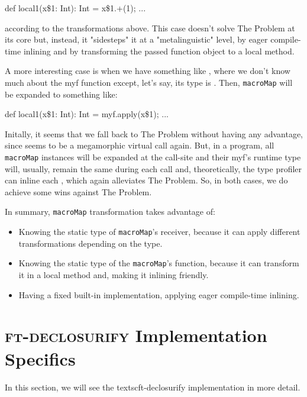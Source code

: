 \begin{scalaCode}
{
  def local1(x\$1: Int): Int = x\$1.+(1);
  ...
}
\end{scalaCode}

according to the transformations above. This case doesn't solve The Problem
at its core but, instead, it "sidesteps" it at a "metalinguistic" level, by
eager compile-time inlining and by transforming the passed function
object to a local method.

A more interesting case is when we have something like , where we don't know much about the myf function except, let's
say, its type is . Then, \texttt{macroMap} will be expanded to something
like:

\begin{scalaCode}
{
 def local1(x\$1: Int): Int = myf.apply(x\$1);
  ...
}
\end{scalaCode}

Initally, it seems that we fall back to The Problem without having any
advantage, since  seems to be a megamorphic virtual call again.
But, in a program, all \texttt{macroMap} instances will be expanded at the call-site and their myf's
runtime type will, usually, remain the same during each call and, theoretically,
the type profiler can inline each , which again alleviates 
The Problem. So, in both cases, we do achieve some wins against The Problem.

In summary, \texttt{macroMap} transformation takes advantage of:
\begin{itemize}
 \item Knowing the static type of \texttt{macroMap}'s receiver, because it can apply different transformations depending on the type.
  \item Knowing the static type of the \texttt{macroMap}'s function, because it can transform it in a local method and, making it inlining friendly.
  \item Having a fixed built-in implementation, applying eager compile-time inlining.
\end{itemize}


\section{\textsc{ft-declosurify} Implementation Specifics}
\label{ft_declosurify_impl}

In this section, we will see the textsc{ft-declosurify} implementation in more detail.

